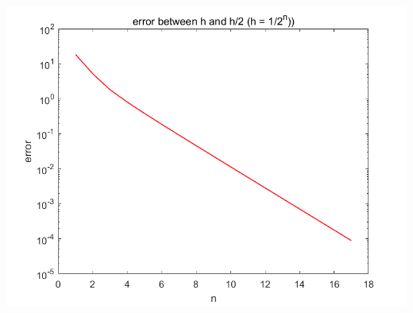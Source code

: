 \documentclass{article}
\begin{document}
\begin{flushleft}
\begin{enumerate}
\begin{framed}
\begin{multicols}{2}
\columnbreak
\includegraphics[width={\linewidth}]{Q2_a_e.png}
\end{multicols}




\end{framed}
\end{enumerate}
\end{flushleft}
\end{document}
